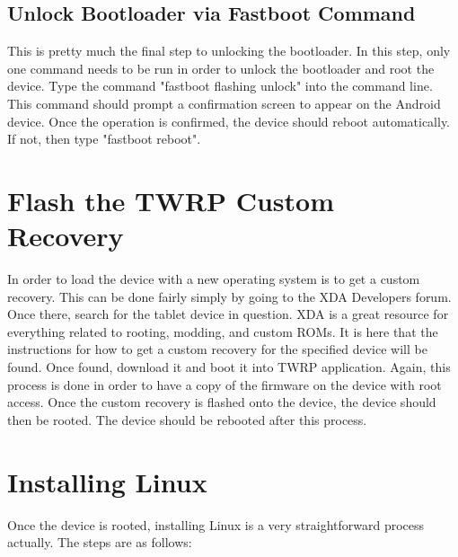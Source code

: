 \subsection{Unlock Bootloader via Fastboot Command}
This is pretty much the final step to unlocking the bootloader. In this step, only one command needs to be run in order to unlock the bootloader and root the device. 
Type the command "fastboot flashing unlock" into the command line. This command should prompt a confirmation screen to appear on the Android device. 
Once the operation is confirmed, the device should reboot automatically. If not, then type "fastboot reboot".

\section{Flash the TWRP Custom Recovery}
In order to load the device with a new operating system is to get a custom recovery. This can be done fairly simply by going to the XDA Developers forum. 
Once there, search for the tablet device in question. XDA is a great resource for everything related to rooting, modding, and custom ROMs. It is here that 
the instructions for how to get a custom recovery for the specified device will be found. Once found, download it and boot it into TWRP application. Again, 
this process is done in order to have a copy of the firmware on the device with root access. Once the custom recovery is flashed onto the device, the device should 
then be rooted. The device should be rebooted after this process.


\section{Installing Linux}
Once the device is rooted, installing Linux is a very straightforward process actually. The steps are as follows:


